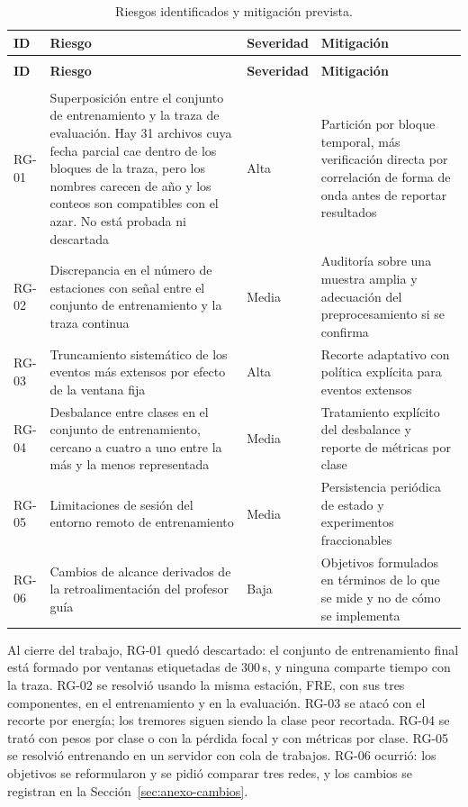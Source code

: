 {\small
\begin{longtable}{>{\raggedright\arraybackslash}p{1.1cm}>{\raggedright\arraybackslash}p{4.3cm}>{\raggedright\arraybackslash}p{1.8cm}>{\raggedright\arraybackslash}p{4.3cm}}
\caption{Riesgos identificados y mitigación prevista.}\label{tab:riesgos}\\
\toprule
\textbf{ID} & \textbf{Riesgo} & \textbf{Severidad} & \textbf{Mitigación} \\
\midrule
\endfirsthead
\multicolumn{4}{l}{\itshape Cuadro \thetable{} (continuación)}\\
\toprule
\textbf{ID} & \textbf{Riesgo} & \textbf{Severidad} & \textbf{Mitigación} \\
\midrule
\endhead
\midrule
\multicolumn{4}{r}{\itshape Continúa en la página siguiente}\\
\endfoot
\bottomrule
\endlastfoot
RG-01 & Superposición entre el conjunto de entrenamiento y la traza de
evaluación. Hay 31 archivos cuya fecha parcial cae dentro de los bloques de la
traza, pero los nombres carecen de año y los conteos son compatibles con el azar.
No está probada ni descartada &
Alta &
Partición por bloque temporal, más verificación directa por correlación de forma
de onda antes de reportar resultados \\
\addlinespace
RG-02 & Discrepancia en el número de estaciones con señal entre el conjunto de
entrenamiento y la traza continua &
Media &
Auditoría sobre una muestra amplia y adecuación del preprocesamiento si se
confirma \\
\addlinespace
RG-03 & Truncamiento sistemático de los eventos más extensos por efecto de la
ventana fija &
Alta &
Recorte adaptativo con política explícita para eventos extensos \\
\addlinespace
RG-04 & Desbalance entre clases en el conjunto de entrenamiento, cercano a cuatro
a uno entre la más y la menos representada &
Media &
Tratamiento explícito del desbalance y reporte de métricas por clase \\
\addlinespace
RG-05 & Limitaciones de sesión del entorno remoto de entrenamiento &
Media &
Persistencia periódica de estado y experimentos fraccionables \\
\addlinespace
RG-06 & Cambios de alcance derivados de la retroalimentación del profesor guía &
Baja &
Objetivos formulados en términos de lo que se mide y no de cómo se implementa \\
\bottomrule
\end{longtable}
}

Al cierre del trabajo, RG-01 quedó descartado: el conjunto de entrenamiento
final está formado por ventanas etiquetadas de 300\,s, y ninguna comparte tiempo
con la traza. RG-02 se resolvió usando la misma estación, FRE, con sus tres
componentes, en el entrenamiento y en la evaluación. RG-03 se atacó con el
recorte por energía; los tremores siguen siendo la clase peor recortada. RG-04
se trató con pesos por clase o con la pérdida focal y con métricas por clase.
RG-05 se resolvió entrenando en un servidor con cola de trabajos. RG-06 ocurrió:
los objetivos se reformularon y se pidió comparar tres redes, y los cambios se
registran en la Sección~\ref{sec:anexo-cambios}.

